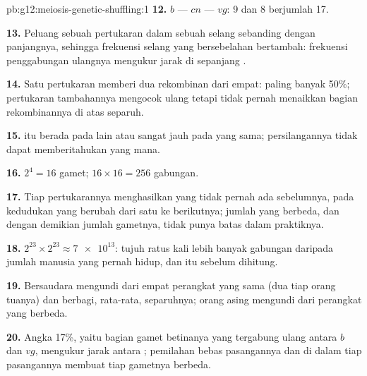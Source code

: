 \begin{solution}{pb:g12:meiosis-genetic-shuffling:1}
\textbf{12.} $b$ --- $cn$ --- $vg$: 9 dan 8 berjumlah 17.

\textbf{13.} Peluang sebuah pertukaran dalam sebuah selang sebanding
dengan panjangnya, sehingga frekuensi selang yang bersebelahan
bertambah: frekuensi penggabungan ulangnya mengukur jarak di sepanjang
.

\textbf{14.} Satu pertukaran memberi dua  rekombinan dari
empat: paling banyak 50\%; pertukaran tambahannya mengocok ulang tetapi
tidak pernah menaikkan bagian rekombinannya di atas separuh.

\textbf{15.}  itu berada pada  lain atau sangat jauh pada
 yang sama; persilangannya tidak dapat memberitahukan yang mana.

\textbf{16.} $2^4 = 16$ gamet; $16 \times 16 = 256$ gabungan.

\textbf{17.} Tiap pertukarannya menghasilkan  yang tidak pernah
ada sebelumnya, pada kedudukan yang berubah dari satu  ke
 berikutnya; jumlah  yang berbeda, dan dengan demikian
jumlah gametnya, tidak punya batas dalam praktiknya.

\textbf{18.} $2^{23} \times 2^{23} \approx \num{7e13}$: tujuh ratus
kali lebih banyak gabungan daripada jumlah manusia yang pernah hidup,
dan itu sebelum  dihitung.

\textbf{19.} Bersaudara mengundi  dari empat perangkat yang sama
(dua tiap orang tuanya) dan berbagi, rata-rata, separuhnya; orang asing
mengundi dari perangkat yang berbeda.

\textbf{20.} Angka 17\%, yaitu bagian gamet betinanya yang tergabung
ulang antara $b$ dan $vg$, mengukur jarak antara ; pemilahan
bebas pasangannya dan  di dalam tiap pasangannya membuat
tiap gametnya berbeda.
\end{solution}
